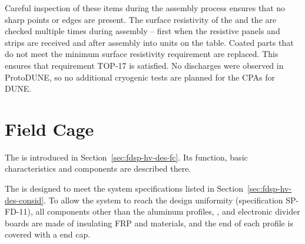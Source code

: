 Careful inspection of these items during the assembly process ensures that no sharp points or edges are present. The surface resistivity of the   and the  are checked multiple times during assembly -- first when the resistive panels and strips are received and after assembly into  units on the table.  Coated parts that do not meet the minimum surface resistivity requirement are replaced.  This ensures that requirement TOP-17 is satisfied. No discharges were observed in ProtoDUNE, so no additional cryogenic tests are planned for the CPAs for DUNE.



\section{Field Cage}


The  is introduced in Section~\ref{sec:fdsp-hv-des-fc}. Its function, basic characteristics and components are described there. 

The  %
is designed to %
meet the system specifications listed in Section~\ref{sec:fdsp-hv-des-consid}. %
To allow the system to reach the design \efield{} uniformity 
(specification SP-FD-11), 
all components other than the aluminum profiles, , and electronic divider boards are made of insulating FRP and \frfour materials, and the end of each profile is covered with a  end cap. \\


